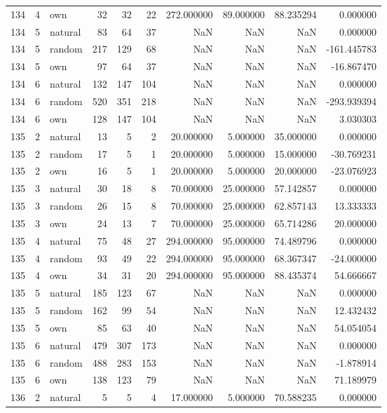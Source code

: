 \begin{table}[htbp]
\begin{tabular}{rrlrrrrrrr}
134 & 4 & own & 32 & 32 & 22 & 272.000000 & 89.000000 & 88.235294 & 0.000000 \\
134 & 5 & natural & 83 & 64 & 37 & NaN & NaN & NaN & 0.000000 \\
134 & 5 & random & 217 & 129 & 68 & NaN & NaN & NaN & -161.445783 \\
134 & 5 & own & 97 & 64 & 37 & NaN & NaN & NaN & -16.867470 \\
134 & 6 & natural & 132 & 147 & 104 & NaN & NaN & NaN & 0.000000 \\
134 & 6 & random & 520 & 351 & 218 & NaN & NaN & NaN & -293.939394 \\
134 & 6 & own & 128 & 147 & 104 & NaN & NaN & NaN & 3.030303 \\
135 & 2 & natural & 13 & 5 & 2 & 20.000000 & 5.000000 & 35.000000 & 0.000000 \\
135 & 2 & random & 17 & 5 & 1 & 20.000000 & 5.000000 & 15.000000 & -30.769231 \\
135 & 2 & own & 16 & 5 & 1 & 20.000000 & 5.000000 & 20.000000 & -23.076923 \\
135 & 3 & natural & 30 & 18 & 8 & 70.000000 & 25.000000 & 57.142857 & 0.000000 \\
135 & 3 & random & 26 & 15 & 8 & 70.000000 & 25.000000 & 62.857143 & 13.333333 \\
135 & 3 & own & 24 & 13 & 7 & 70.000000 & 25.000000 & 65.714286 & 20.000000 \\
135 & 4 & natural & 75 & 48 & 27 & 294.000000 & 95.000000 & 74.489796 & 0.000000 \\
135 & 4 & random & 93 & 49 & 22 & 294.000000 & 95.000000 & 68.367347 & -24.000000 \\
135 & 4 & own & 34 & 31 & 20 & 294.000000 & 95.000000 & 88.435374 & 54.666667 \\
135 & 5 & natural & 185 & 123 & 67 & NaN & NaN & NaN & 0.000000 \\
135 & 5 & random & 162 & 99 & 54 & NaN & NaN & NaN & 12.432432 \\
135 & 5 & own & 85 & 63 & 40 & NaN & NaN & NaN & 54.054054 \\
135 & 6 & natural & 479 & 307 & 173 & NaN & NaN & NaN & 0.000000 \\
135 & 6 & random & 488 & 283 & 153 & NaN & NaN & NaN & -1.878914 \\
135 & 6 & own & 138 & 123 & 79 & NaN & NaN & NaN & 71.189979 \\
136 & 2 & natural & 5 & 5 & 4 & 17.000000 & 5.000000 & 70.588235 & 0.000000 \\

\end{tabular}
\end{table}
